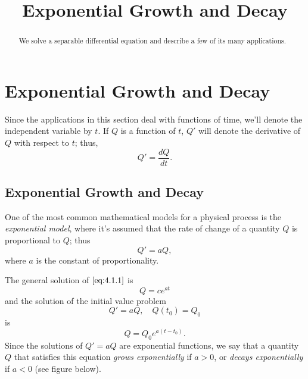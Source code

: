 \documentclass{ximera}
\title{Exponential Growth and Decay}%
\begin{document}
\begin{abstract}
We solve a separable differential equation and describe a few of its many applications.
\end{abstract}

\maketitle

\section*{Exponential Growth and Decay}

Since the applications in this section deal with functions of time, we'll
 denote the independent variable by $t$. If $Q$ is a function of
$t$, $Q'$ will denote the derivative of $Q$ with respect to $t$;
thus,
$$
Q'=\frac{dQ}{dt}.
$$

\subsection*{Exponential Growth and Decay}

One of the most common mathematical models for a physical process is
the \textit{exponential model}, where it's assumed that the rate
of change of a quantity $Q$ is proportional to $Q$; thus
\begin{equation} \label{eq:4.1.1}
Q'=aQ,
\end{equation}
 where $a$ is the constant of proportionality.

The general solution of
$\eqref{eq:4.1.1}$ is
$$
Q=ce^{at}
$$
 and the solution of the initial value problem
$$
Q'=aQ, \quad Q(t_0)=Q_0
$$
 is
\begin{equation} \label{eq:4.1.2}
Q=Q_0e^{a(t-t_0)}.
\end{equation}
Since the solutions of $Q'=aQ$ are exponential functions, we say that
a
quantity $Q$ that satisfies this equation \textit{grows exponentially} if
$a > 0$, or \textit{decays exponentially} if $a < 0$ (see figure below).


\begin{center}
\end{center}

\end{document}
